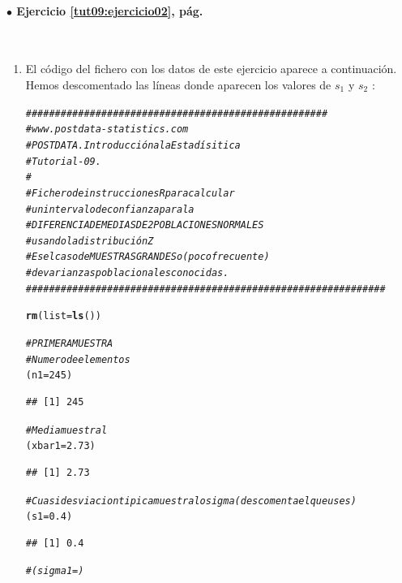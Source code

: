 \documentclass[10pt,a4paper]{article}\usepackage[]{graphicx}\usepackage[]{color}
\makeatletter
\newcommand{\hlnum}[1]{\textcolor[rgb]{0.686,0.059,0.569}{#1}}%
\newcommand{\hlcom}[1]{\textcolor[rgb]{0.678,0.584,0.686}{\textit{#1}}}%
\newcommand{\hlstd}[1]{\textcolor[rgb]{0.345,0.345,0.345}{#1}}%
\newcommand{\hlkwb}[1]{\textcolor[rgb]{0.69,0.353,0.396}{#1}}%
\newcommand{\hlkwc}[1]{\textcolor[rgb]{0.333,0.667,0.333}{#1}}%
\newcommand{\hlkwd}[1]{\textcolor[rgb]{0.737,0.353,0.396}{\textbf{#1}}}%
\newenvironment{kframe}{%
 \def\at@end@of@kframe{}%
 \ifinner\ifhmode%
  \def\at@end@of@kframe{\end{minipage}}%
  \begin{minipage}{\columnwidth}%
 \fi\fi%
 \def\FrameCommand##1{\hskip\@totalleftmargin \hskip-\fboxsep
 \colorbox{shadecolor}{##1}\hskip-\fboxsep
     \hskip-\linewidth \hskip-\@totalleftmargin \hskip\columnwidth}%
 \MakeFramed {\advance\hsize-\width
   \@totalleftmargin\z@ \linewidth\hsize
   \@setminipage}}%
 {\par\unskip\endMakeFramed%
 \at@end@of@kframe}
\newenvironment{knitrout}{}{} %
\newcounter {cont01}
\makeatother
\begin{document}
{\paragraph{\bf $\bullet$ Ejercicio \ref{tut09:ejercicio02}, pág. \pageref{tut09:ejercicio02}}
\label{tut09:ejercicio02:sol}\quad\\

\begin{enumerate}
  \item El código del fichero con los datos de este ejercicio aparece a continuación. Hemos descomentado las líneas donde aparecen los valores de $s_1$ y $s_2$ :

\begin{knitrout}
\color{fgcolor}\begin{kframe}
\begin{alltt}
    \hlcom{####################################################}
    \hlcom{# www.postdata-statistics.com}
    \hlcom{# POSTDATA. Introducción a la Estadísitica}
    \hlcom{# Tutorial-09.}
    \hlcom{#}
    \hlcom{# Fichero de instrucciones R para calcular}
    \hlcom{# un intervalo de confianza para la}
    \hlcom{# DIFERENCIA DE MEDIAS DE 2 POBLACIONES NORMALES}
    \hlcom{# usando la distribución Z}
    \hlcom{# Es el caso de MUESTRAS GRANDES o (poco frecuente)}
    \hlcom{# de varianzas poblacionales conocidas.}
    \hlcom{##############################################################}


    \hlkwd{rm}\hlstd{(}\hlkwc{list}\hlstd{=}\hlkwd{ls}\hlstd{())}

    \hlcom{# PRIMERA MUESTRA}
    \hlcom{# Numero de elementos}
    \hlstd{(n1} \hlkwb{=} \hlnum{245}\hlstd{)}
\end{alltt}
\begin{verbatim}
## [1] 245
\end{verbatim}
\begin{alltt}
    \hlcom{# Media muestral}
    \hlstd{(xbar1} \hlkwb{=} \hlnum{2.73}\hlstd{)}
\end{alltt}
\begin{verbatim}
## [1] 2.73
\end{verbatim}
\begin{alltt}
    \hlcom{# Cuasidesviacion tipica muestral o sigma (descomenta el que uses)}
    \hlstd{(s1} \hlkwb{=} \hlnum{0.4}\hlstd{)}
\end{alltt}
\begin{verbatim}
## [1] 0.4
\end{verbatim}
\begin{alltt}
    \hlcom{#(sigma1 = )}



\end{alltt}
\end{kframe}
\end{knitrout}
\end{enumerate}}
\end{document}
